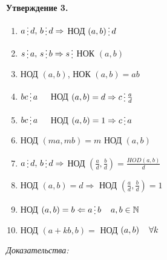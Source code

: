 \documentclass[12pt]{article}
\begin{document}
    \textbf{Утверждение 3.}\par
    \begin{enumerate}
        \item $a \mathop{\raisebox{-2pt}{\vdots}} d , \, b \mathop{\raisebox{-2pt}{\vdots}} d \Rightarrow$ НОД $(a,b) \mathop{\raisebox{-2pt}{\vdots}} d$
        \item $s \mathop{\raisebox{-2pt}{\vdots}} a , \, s \mathop{\raisebox{-2pt}{\vdots}} b \Rightarrow s \mathop{\raisebox{-2pt}{\vdots}}$ НОК $(a,b)$
        \item НОД $(a,b)$, НОК $(a,b) = ab$
        \item $bc \mathop{\raisebox{-2pt}{\vdots}} a \hspace{4 mm}$ НОД $(a,b)=d \Rightarrow c \mathop{\raisebox{-2pt}{\vdots}} \frac{a}{d}$
        \item $bc \mathop{\raisebox{-2pt}{\vdots}} a \hspace{4 mm}$ НОД $(a,b)=1 \Rightarrow c \mathop{\raisebox{-2pt}{\vdots}} a$
        \item НОД $(ma, mb) = m$ НОД $(a,b)$
        \item $a \mathop{\raisebox{-2pt}{\vdots}} d, \, b \mathop{\raisebox{-2pt}{\vdots}} d \Rightarrow$ НОД $(\frac{a}{d}, \frac{b}{d}) = \frac{HOD(a,b)}{d}$
        \item НОД $(a,b) = d \Rightarrow$ НОД $(\frac{a}{d}, \frac{b}{d})=1$
        \item НОД $(a,b)=b \Leftarrow a \mathop{\raisebox{-2pt}{\vdots}} b \hspace{4 mm} a,b \in \mathbb{N}$
        \item НОД $(a+kb,b) =$ НОД $(a,b) \hspace{4 mm} \forall k$
    \end{enumerate}\par
    \textit{Доказательства:}\par
\end{document}
